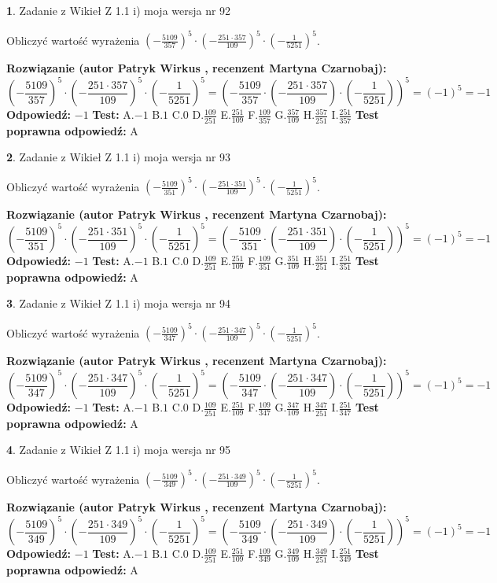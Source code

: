 \documentclass[12pt, a4paper]{article}
\theoremstyle{definition} %
\newtheorem{zad}{}
\newcommand{\zadStart}[1]{\begin{zad}#1\newline}
\newcommand{\zadStop}{\end{zad}}
\newcommand{\rozwStart}[2]{\noindent \textbf{Rozwiązanie (autor #1 , recenzent #2): }\newline}
\newcommand{\rozwStop}{\newline}
\newcommand{\odpStart}{\noindent \textbf{Odpowiedź:}\newline}
\newcommand{\odpStop}{\newline}
\newcommand{\testStart}{\noindent \textbf{Test:}\newline}
\newcommand{\testStop}{\newline}
\newcommand{\kluczStart}{\noindent \textbf{Test poprawna odpowiedź:}\newline}
\newcommand{\kluczStop}{\newline}
\begin{document}
\zadStart{Zadanie z Wikieł Z 1.1 i) moja wersja nr 92}

Obliczyć wartość wyrażenia $(-\frac{5109}{357})^{5} \cdot (-\frac{251 \cdot 357}{109})^{5} \cdot (-\frac{1}{5251})^{5}$.
\zadStop
\rozwStart{Patryk Wirkus}{Martyna Czarnobaj}
$$(-\frac{5109}{357})^{5} \cdot (-\frac{251 \cdot 357}{109})^{5} \cdot (-\frac{1}{5251})^{5} = (-\frac{5109}{357} \cdot (-\frac{251 \cdot 357}{109}) \cdot (-\frac{1}{5251}))^{5} = (-1)^{5} = -1$$
\rozwStop
\odpStart
$-1$
\odpStop
\testStart
A.$-1$ B.$1$ C.$0$ D.$\frac{109}{251}$ E.$\frac{251}{109}$
F.$\frac{109}{357}$ G.$\frac{357}{109}$
H.$\frac{357}{251}$
I.$\frac{251}{357}$
\testStop
\kluczStart
A
\kluczStop



\zadStart{Zadanie z Wikieł Z 1.1 i) moja wersja nr 93}

Obliczyć wartość wyrażenia $(-\frac{5109}{351})^{5} \cdot (-\frac{251 \cdot 351}{109})^{5} \cdot (-\frac{1}{5251})^{5}$.
\zadStop
\rozwStart{Patryk Wirkus}{Martyna Czarnobaj}
$$(-\frac{5109}{351})^{5} \cdot (-\frac{251 \cdot 351}{109})^{5} \cdot (-\frac{1}{5251})^{5} = (-\frac{5109}{351} \cdot (-\frac{251 \cdot 351}{109}) \cdot (-\frac{1}{5251}))^{5} = (-1)^{5} = -1$$
\rozwStop
\odpStart
$-1$
\odpStop
\testStart
A.$-1$ B.$1$ C.$0$ D.$\frac{109}{251}$ E.$\frac{251}{109}$
F.$\frac{109}{351}$ G.$\frac{351}{109}$
H.$\frac{351}{251}$
I.$\frac{251}{351}$
\testStop
\kluczStart
A
\kluczStop



\zadStart{Zadanie z Wikieł Z 1.1 i) moja wersja nr 94}

Obliczyć wartość wyrażenia $(-\frac{5109}{347})^{5} \cdot (-\frac{251 \cdot 347}{109})^{5} \cdot (-\frac{1}{5251})^{5}$.
\zadStop
\rozwStart{Patryk Wirkus}{Martyna Czarnobaj}
$$(-\frac{5109}{347})^{5} \cdot (-\frac{251 \cdot 347}{109})^{5} \cdot (-\frac{1}{5251})^{5} = (-\frac{5109}{347} \cdot (-\frac{251 \cdot 347}{109}) \cdot (-\frac{1}{5251}))^{5} = (-1)^{5} = -1$$
\rozwStop
\odpStart
$-1$
\odpStop
\testStart
A.$-1$ B.$1$ C.$0$ D.$\frac{109}{251}$ E.$\frac{251}{109}$
F.$\frac{109}{347}$ G.$\frac{347}{109}$
H.$\frac{347}{251}$
I.$\frac{251}{347}$
\testStop
\kluczStart
A
\kluczStop



\zadStart{Zadanie z Wikieł Z 1.1 i) moja wersja nr 95}

Obliczyć wartość wyrażenia $(-\frac{5109}{349})^{5} \cdot (-\frac{251 \cdot 349}{109})^{5} \cdot (-\frac{1}{5251})^{5}$.
\zadStop
\rozwStart{Patryk Wirkus}{Martyna Czarnobaj}
$$(-\frac{5109}{349})^{5} \cdot (-\frac{251 \cdot 349}{109})^{5} \cdot (-\frac{1}{5251})^{5} = (-\frac{5109}{349} \cdot (-\frac{251 \cdot 349}{109}) \cdot (-\frac{1}{5251}))^{5} = (-1)^{5} = -1$$
\rozwStop
\odpStart
$-1$
\odpStop
\testStart
A.$-1$ B.$1$ C.$0$ D.$\frac{109}{251}$ E.$\frac{251}{109}$
F.$\frac{109}{349}$ G.$\frac{349}{109}$
H.$\frac{349}{251}$
I.$\frac{251}{349}$
\testStop
\kluczStart
A
\kluczStop
\end{document}
